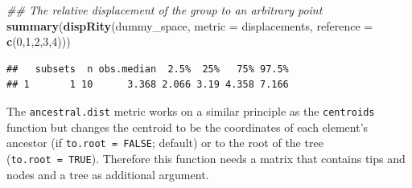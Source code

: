 \documentclass[]{book}
\newenvironment{Shaded}{\begin{snugshade}}{\end{snugshade}}
\newcommand{\CommentTok}[1]{\textcolor[rgb]{0.56,0.35,0.01}{\textit{#1}}}
\newcommand{\DataTypeTok}[1]{\textcolor[rgb]{0.13,0.29,0.53}{#1}}
\newcommand{\DecValTok}[1]{\textcolor[rgb]{0.00,0.00,0.81}{#1}}
\newcommand{\KeywordTok}[1]{\textcolor[rgb]{0.13,0.29,0.53}{\textbf{#1}}}
\newcommand{\NormalTok}[1]{#1}
\newcommand{\OperatorTok}[1]{\textcolor[rgb]{0.81,0.36,0.00}{\textbf{#1}}}
\newcommand{\StringTok}[1]{\textcolor[rgb]{0.31,0.60,0.02}{#1}}
\begin{document}
\begin{Shaded}
\begin{Highlighting}[]
\CommentTok{## The relative displacement of the group to an arbitrary point}
\KeywordTok{summary}\NormalTok{(}\KeywordTok{dispRity}\NormalTok{(dummy_space, }\DataTypeTok{metric =}\NormalTok{ displacements,}
                 \DataTypeTok{reference =} \KeywordTok{c}\NormalTok{(}\DecValTok{0}\NormalTok{,}\DecValTok{1}\NormalTok{,}\DecValTok{2}\NormalTok{,}\DecValTok{3}\NormalTok{,}\DecValTok{4}\NormalTok{)))}
\end{Highlighting}
\end{Shaded}

\begin{verbatim}
##   subsets  n obs.median  2.5%  25%   75% 97.5%
## 1       1 10      3.368 2.066 3.19 4.358 7.166
\end{verbatim}

The \texttt{ancestral.dist} metric works on a similar principle as the \texttt{centroids} function but changes the centroid to be the coordinates of each element's ancestor (if \texttt{to.root\ =\ FALSE}; default) or to the root of the tree (\texttt{to.root\ =\ TRUE}).
Therefore this function needs a matrix that contains tips and nodes and a tree as additional argument.

\begin{Shaded}
\end{Shaded}
\end{document}
